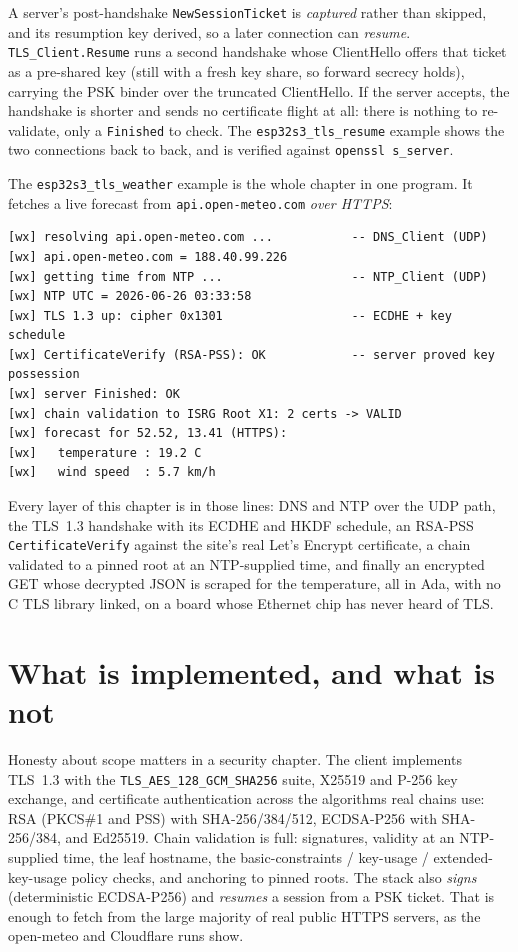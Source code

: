 A server's post-handshake \texttt{NewSessionTicket} is \emph{captured} rather than
skipped, and its resumption key derived, so a later connection can \emph{resume}.
\texttt{TLS\_Client.Resume} runs a second handshake whose ClientHello offers that
ticket as a pre-shared key (still with a fresh key share, so forward secrecy
holds), carrying the PSK binder over the truncated ClientHello. If the server
accepts, the handshake is shorter and sends no certificate flight at all: there is
nothing to re-validate, only a \texttt{Finished} to check. The
\texttt{esp32s3\_tls\_resume} example shows the two connections back to back, and
is verified against \texttt{openssl s\_server}.

The \texttt{esp32s3\_tls\_weather} example is the whole chapter in one program. It
fetches a live forecast from \texttt{api.open-meteo.com} \emph{over HTTPS}:

\begin{lstlisting}
[wx] resolving api.open-meteo.com ...           -- DNS_Client (UDP)
[wx] api.open-meteo.com = 188.40.99.226
[wx] getting time from NTP ...                  -- NTP_Client (UDP)
[wx] NTP UTC = 2026-06-26 03:33:58
[wx] TLS 1.3 up: cipher 0x1301                  -- ECDHE + key schedule
[wx] CertificateVerify (RSA-PSS): OK            -- server proved key possession
[wx] server Finished: OK
[wx] chain validation to ISRG Root X1: 2 certs -> VALID
[wx] forecast for 52.52, 13.41 (HTTPS):
[wx]   temperature : 19.2 C
[wx]   wind speed  : 5.7 km/h
\end{lstlisting}

Every layer of this chapter is in those lines: DNS and NTP over the UDP path, the
TLS~1.3 handshake with its ECDHE and HKDF schedule, an RSA-PSS
\texttt{CertificateVerify} against the site's real Let's Encrypt certificate, a
chain validated to a pinned root at an NTP-supplied time, and finally an encrypted
GET whose decrypted JSON is scraped for the temperature, all in Ada, with no C
TLS library linked, on a board whose Ethernet chip has never heard of TLS.

\section{What is implemented, and what is not}
\label{ch:tls:status}

Honesty about scope matters in a security chapter. The client implements TLS~1.3
with the \texttt{TLS\_AES\_128\_GCM\_SHA256} suite, X25519 and P-256 key exchange,
and certificate authentication across the algorithms real chains use: RSA
(PKCS\#1 and PSS) with SHA-256/384/512, ECDSA-P256 with SHA-256/384, and Ed25519.
Chain validation is full: signatures, validity at an NTP-supplied time, the leaf
hostname, the basic-constraints / key-usage / extended-key-usage policy checks,
and anchoring to pinned roots. The stack also \emph{signs} (deterministic
ECDSA-P256) and \emph{resumes} a session from a PSK ticket. That is enough to
fetch from the large majority of real public HTTPS servers, as the open-meteo and
Cloudflare runs show.

